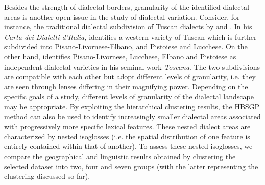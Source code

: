 \documentclass[output=paper]{LSP/langsci}
\begin{document}
Besides the strength of dialectal borders, granularity of the identified dialectal areas is another open issue in the study of dialectal variation. Consider, for instance, the traditional dialectal subdivision of Tuscan dialects by \citet{pellegrini_carta_1977} and \citet{giannelli_toscana_1976}. In his \textit{Carta dei Dialetti d’Italia, }\citet{pellegrini_carta_1977} identifies a western variety of Tuscan which is further subdivided into Pisano-Livornese-Elbano, and Pistoiese and Lucchese. On the other hand, \citet{giannelli_toscana_1976} identifies Pisano-Livornese, Lucchese, Elbano and Pistoiese as independent dialectal varieties in his seminal work \textit{Toscana}. The two subdivisions are compatible with each other but adopt different levels of granularity, i.e. they are seen through lenses differing in their magnifying power. Depending on the specific goals of a study, different levels of granularity of the dialectal landscape may be appropriate. By exploiting the hierarchical clustering results, the HBSGP method can also be used to identify increasingly smaller dialectal areas associated with progressively more specific lexical features. These nested dialect areas are characterized by nested isoglosses (i.e. the spatial distribution of one feature is entirely contained within that of another). To assess these nested isoglosses, we compare the geographical and linguistic results obtained by clustering the selected dataset into two, four and seven groups (with the latter representing the clustering discussed so far).
\end{document}

